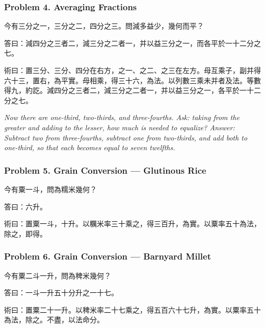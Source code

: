 \documentclass[11pt,a4paper]{article}
\newcommand{\zh}[1]{{\CJKfamily{}#1}}
\begin{document}
\subsubsection*{Problem 4. Averaging Fractions}

\begin{problembox}[title=\zh{問}]
\zh{今有三分之一，三分之二，四分之三。問減多益少，幾何而平？}
\end{problembox}
\begin{answerbox}[title=\zh{答}]
\zh{答曰：減四分之三者二，減三分之二者一，并以益三分之一，而各平於一十二分之七。}
\end{answerbox}
\begin{methodbox}[title=\zh{術}]
\zh{術曰：置三分、三分、四分在右方，之一、之二、之三在左方。母互乘子，副并得六十三，置右，為平實。母相乘，得三十六，為法。以列數三乘未并者及法。等數得九，約訖。減四分之三者二，減三分之二者一，并以益三分之一，各平於一十二分之七。}
\end{methodbox}

\textit{Now there are one-third, two-thirds, and three-fourths. Ask: taking from the greater and adding to the lesser, how much is needed to equalize? Answer: Subtract two from three-fourths, subtract one from two-thirds, and add both to one-third, so that each becomes equal to seven twelfths.}

\subsubsection*{Problem 5. Grain Conversion --- Glutinous Rice}

\begin{problembox}[title=\zh{問}]
\zh{今有粟一斗，問為糯米幾何？}
\end{problembox}
\begin{answerbox}[title=\zh{答}]
\zh{答曰：六升。}
\end{answerbox}
\begin{methodbox}[title=\zh{術}]
\zh{術曰：置粟一斗，十升。以糲米率三十乘之，得三百升，為實。以粟率五十為法，除之，即得。}
\end{methodbox}

\subsubsection*{Problem 6. Grain Conversion --- Barnyard Millet}

\begin{problembox}[title=\zh{問}]
\zh{今有粟二斗一升，問為稗米幾何？}
\end{problembox}
\begin{answerbox}[title=\zh{答}]
\zh{答曰：一斗一升五十分升之一十七。}
\end{answerbox}
\begin{methodbox}[title=\zh{術}]
\zh{術曰：置粟二十一升。以稗米率二十七乘之，得五百六十七升，為實。以粟率五十為法，除之。不盡，以法命分。}
\end{methodbox}
\end{document}
